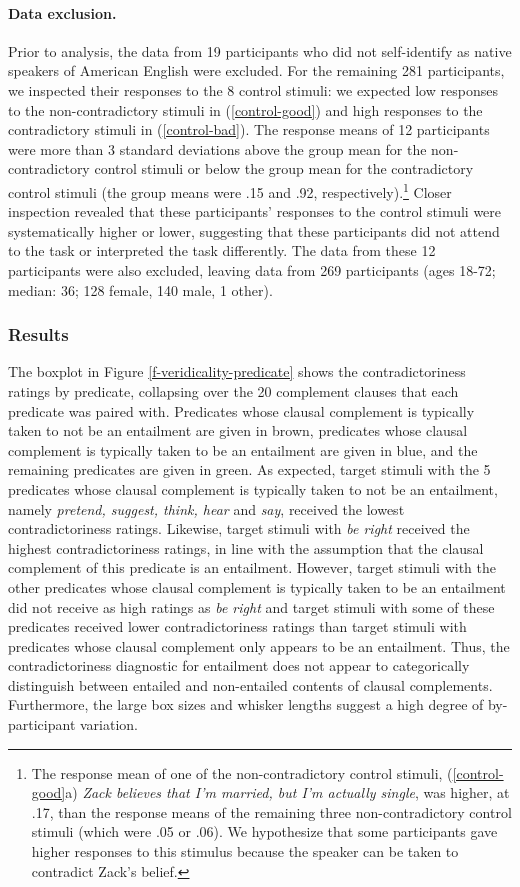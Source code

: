 \documentclass[11pt,fleqn]{article}
\newcommand{\6}{\mbox{$[\hspace*{-.6mm}[$}}
\newcommand{\9}{\mbox{$]\hspace*{-.6mm}]$}}
\begin{document}
\paragraph{Data exclusion.}
Prior to analysis, the data from 19 participants who did not self-identify as native speakers of American English were excluded. For the remaining 281 participants, we inspected their responses to the 8 control stimuli: we expected low responses to the non-contradictory stimuli in (\ref{control-good}) and high responses to the contradictory stimuli in (\ref{control-bad}). The response means of 12 participants were more than 3 standard deviations above the group mean for the non-contradictory control stimuli or below the group mean for the contradictory control stimuli (the group means were .15 and .92, respectively).\footnote{The response mean of one of the non-contradictory control stimuli, (\ref{control-good}a) {\em Zack believes that I'm married, but I'm actually single}, was higher, at .17, than the response means of the remaining three non-contradictory control stimuli (which were .05 or .06). We hypothesize that some participants gave higher responses to this stimulus because the speaker can be taken to contradict Zack's belief.} Closer inspection revealed that these participants' responses to the control stimuli were systematically higher or lower, suggesting that these participants did not attend to the task or interpreted the task differently. The data from these 12 participants were also excluded, leaving data from 269 participants (ages 18-72; median: 36; 128 female, 140 male, 1 other).  

\subsubsection{Results}

The boxplot in Figure \ref{f-veridicality-predicate} shows the contradictoriness ratings by predicate, collapsing over the 20 complement clauses that each predicate was paired with. Predicates whose clausal complement is typically taken to not be an entailment are given in brown, predicates whose clausal complement is typically taken to be an entailment are given in blue, and the remaining predicates are given in green. As expected, target stimuli with the 5 predicates whose clausal complement is typically taken to not be an entailment, namely {\em pretend, suggest, think, hear} and {\em say}, received the lowest contradictoriness ratings. Likewise, target stimuli with {\em be right} received the highest contradictoriness ratings, in line with the assumption that the clausal complement of this predicate is an entailment. However, target stimuli with the other predicates whose clausal complement is typically taken to be an entailment did not receive as high ratings as {\em be right} and target stimuli with some of these predicates received lower contradictoriness ratings than target stimuli with predicates whose clausal complement only appears to be an entailment. Thus, the contradictoriness diagnostic for entailment does not appear to categorically distinguish between entailed and non-entailed contents of clausal complements. Furthermore, the large box sizes and whisker lengths suggest a high degree of by-participant variation.
\end{document}
